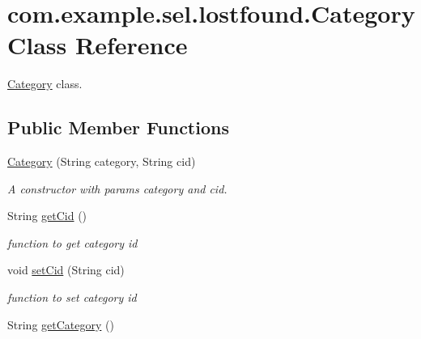 \hypertarget{classcom_1_1example_1_1sel_1_1lostfound_1_1Category}{\section{com.\-example.\-sel.\-lostfound.\-Category Class Reference}
\label{classcom_1_1example_1_1sel_1_1lostfound_1_1Category}
}


\hyperlink{classcom_1_1example_1_1sel_1_1lostfound_1_1Category}{Category} class.  


\subsection*{Public Member Functions}
\begin{DoxyCompactItemize}
\item 
\hyperlink{classcom_1_1example_1_1sel_1_1lostfound_1_1Category_a01e1a68dd2639ab6bee0007cc1dcf294}{Category} (String category, String cid)
\begin{DoxyCompactList}\small\item\em A constructor with params category and cid. \end{DoxyCompactList}\item 
\hypertarget{classcom_1_1example_1_1sel_1_1lostfound_1_1Category_a9394ecafd86528fa00554aecbc76ebdb}{String \hyperlink{classcom_1_1example_1_1sel_1_1lostfound_1_1Category_a9394ecafd86528fa00554aecbc76ebdb}{get\-Cid} ()}\label{classcom_1_1example_1_1sel_1_1lostfound_1_1Category_a9394ecafd86528fa00554aecbc76ebdb}

\begin{DoxyCompactList}\small\item\em function to get category id \end{DoxyCompactList}\item 
\hypertarget{classcom_1_1example_1_1sel_1_1lostfound_1_1Category_ae020ac053079f77939440df880c105d7}{void \hyperlink{classcom_1_1example_1_1sel_1_1lostfound_1_1Category_ae020ac053079f77939440df880c105d7}{set\-Cid} (String cid)}\label{classcom_1_1example_1_1sel_1_1lostfound_1_1Category_ae020ac053079f77939440df880c105d7}

\begin{DoxyCompactList}\small\item\em function to set category id \end{DoxyCompactList}\item 
\hypertarget{classcom_1_1example_1_1sel_1_1lostfound_1_1Category_aad1c1ed95ef449791e1e27725ed60314}{String \hyperlink{classcom_1_1example_1_1sel_1_1lostfound_1_1Category_aad1c1ed95ef449791e1e27725ed60314}{get\-Category} ()}\label{classcom_1_1example_1_1sel_1_1lostfound_1_1Category_aad1c1ed95ef449791e1e27725ed60314}


\end{DoxyCompactItemize}
